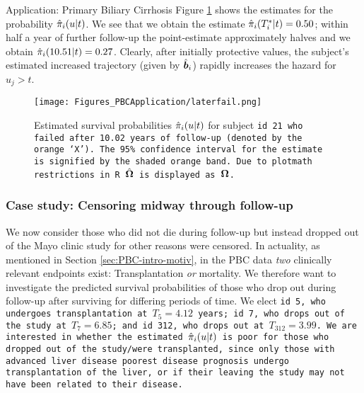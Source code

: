 \begin{chapter}{\label{cha:app-PBC}Application: Primary Biliary Cirrhosis}
  Figure \ref{fig:pbc-final-model-dynpreds-laterfail} shows the estimates for the probability $\hat{\pi}_i\!\left( u|t\right)$. We see that we obtain the estimate $\hat{\pi}_i\!\left( T_i^*|t\right)=0.50$; within half a year of further follow-up the point-estimate approximately halves and we obtain $\hat{\pi}_i\!\left( 10.51|t\right)=0.27$. Clearly, after initially protective values, the subject's estimated increased trajectory (given by $\hat{\bm{b}}_i$) rapidly increases the hazard for $u_j>t$.

  \begin{figure}[ht]
      \centering
      \texttt{[image: Figures\_PBCApplication/laterfail.png]}
      \caption{Estimated survival probabilities $\hat{\pi}_i\!\left( u|t\right)$ for subject \tt{id} 21 who failed after 10.02 years of follow-up (denoted by the orange `X'). The 95\% confidence interval for the estimate is signified by the shaded orange band. Due to \tt{plotmath} restrictions in \tt{R} $\hat{\bm{\Omega}}$ is displayed as $\bm{\mathrm{\Omega}}$.}
      \label{fig:pbc-final-model-dynpreds-laterfail}
  \end{figure}
  
  \subsubsection{Case study: Censoring midway through follow-up}
  We now consider those who did not die during follow-up but instead dropped out of the Mayo clinic study for other reasons \ie were censored. In actuality, as mentioned in Section \ref{sec:PBC-intro-motiv}, in the PBC data \textit{two} clinically relevant endpoints exist: Transplantation \textit{or} mortality. We therefore want to investigate the predicted survival probabilities of those who drop out during follow-up after surviving for differing periods of time. We elect \tt{id} 5, who undergoes transplantation at $T_5=4.12$ years; \tt{id} 7, who drops out of the study at $T_7=6.85$; and \tt{id} 312, who drops out at $T_{312}=3.99$. We are interested in whether the estimated $\hat{\pi}_i\!\left( u|t\right)$ is poor for those who dropped out of the study/were transplanted, since only those with advanced liver disease \ie poorest disease prognosis undergo transplantation of the liver, or if their leaving the study may not have been related to their disease. 


\end{chapter}
